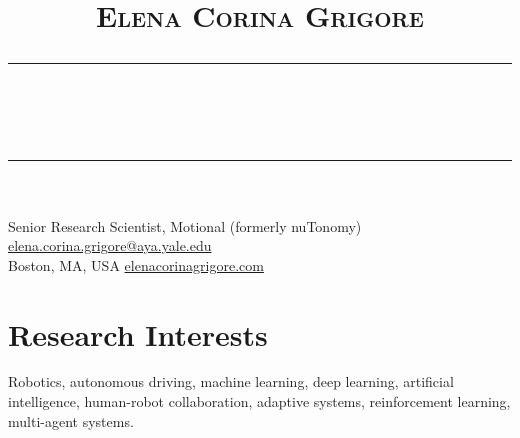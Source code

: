 \documentclass[10pt,letterpaper]{article}
\title{\vspace{-5em}
	\Huge{\textsc{Elena Corina Grigore}}
	\vspace{-0.5em}
	\\\noindent\rule{\linewidth}{0.5pt}
	\vspace{-2.5em}
	\\\noindent\rule{\linewidth}{0.5pt}
	\vspace{-3.2em}
}
\date{}
\begin{document}
\maketitle
\thispagestyle{fancy}



Senior Research Scientist, Motional (formerly nuTonomy) \hfill \href{mailto:elena.corina.grigore@aya.yale.edu}{elena.corina.grigore@aya.yale.edu}\\
Boston, MA, USA \hfill \href{http://elenacorinagrigore.com}{elenacorinagrigore.com}

\vspace{-0.5em}
\section{Research Interests}
\vspace{-0.5em}
Robotics, autonomous driving, machine learning, deep learning, artificial intelligence, human-robot collaboration, adaptive systems, reinforcement learning, multi-agent systems.

\vspace{-1em}
\end{document}
